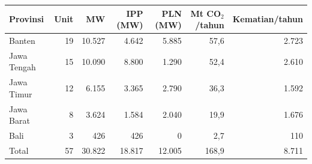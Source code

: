 \begin{tabular}{lrrrrrr}
\toprule
Provinsi & Unit & MW & IPP (MW) & PLN (MW) & Mt CO$_2$/tahun & Kematian/tahun \\
\midrule
Banten & 19 & 10.527 & 4.642 & 5.885 & 57,6 & 2.723 \\
Jawa Tengah & 15 & 10.090 & 8.800 & 1.290 & 52,4 & 2.610 \\
Jawa Timur & 12 & 6.155 & 3.365 & 2.790 & 36,3 & 1.592 \\
Jawa Barat & 8 & 3.624 & 1.584 & 2.040 & 19,9 & 1.676 \\
Bali & 3 & 426 & 426 & 0 & 2,7 & 110 \\
\midrule
Total & 57 & 30.822 & 18.817 & 12.005 & 168,9 & 8.711 \\
\bottomrule
\end{tabular}
